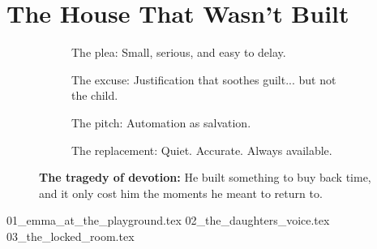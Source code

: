 \section{The House That Wasn't Built}

\vfill


\begin{figure}[H]
    \centering
    
    \begin{subfigure}[t]{0.45\textwidth}
    \centering
    \caption*{The plea: Small, serious, and easy to delay.}
    \end{subfigure}
    \hfill
    \begin{subfigure}[t]{0.45\textwidth}
    \centering
    \caption*{The excuse: Justification that soothes guilt... but not the child.}
    \end{subfigure}
    
    \vspace{1em}
    
    \begin{subfigure}[t]{0.45\textwidth}
    \centering
    \caption*{The pitch: Automation as salvation.}
    \end{subfigure}
    \hfill
    \begin{subfigure}[t]{0.45\textwidth}
    \centering
    \caption*{The replacement: Quiet. Accurate. Always available.}
    \end{subfigure}
    
    \caption*{\textbf{The tragedy of devotion:} He built something to buy back time, and it only cost him the moments he meant to return to.}
  \end{figure}


{01_emma_at_the_playground.tex}
{02_the_daughters_voice.tex}
{03_the_locked_room.tex}